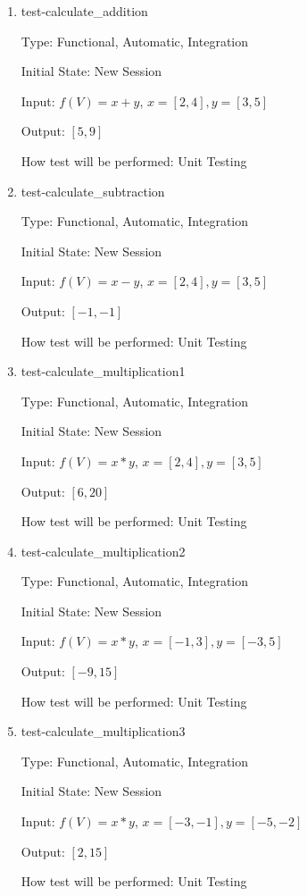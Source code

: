 \documentclass[12pt, titlepage]{article}
\begin{document}
\begin{enumerate}
	
	\item{test-calculate\_addition}
	
	Type: Functional, Automatic, Integration
	
	Initial State: New Session
	
	Input: $f(V) = x + y$, $x = [2,4], y = [3,5]$
	
	Output: $[5,9]$
	
	How test will be performed: Unit Testing\\
	
	\item{test-calculate\_subtraction}
	
	Type: Functional, Automatic, Integration
	
	Initial State: New Session
	
	Input: $f(V) = x - y$, $x = [2,4], y = [3,5]$
	
	Output: $[-1,-1]$
	
	How test will be performed: Unit Testing\\
	
	\item{test-calculate\_multiplication1}
	
	Type: Functional, Automatic, Integration
	
	Initial State: New Session
	
	Input: $f(V) = x * y$, $x = [2,4], y = [3,5]$
	
	Output: $[6,20]$
	
	How test will be performed: Unit Testing\\
	
	\item{test-calculate\_multiplication2}
	
	Type: Functional, Automatic, Integration
	
	Initial State: New Session
	
	Input: $f(V) = x * y$, $x = [-1,3], y = [-3,5]$
	
	Output: $[-9,15]$
	
	How test will be performed: Unit Testing\\
	
	\item{test-calculate\_multiplication3}
	
	Type: Functional, Automatic, Integration
	
	Initial State: New Session
	
	Input: $f(V) = x * y$, $x = [-3,-1], y = [-5,-2]$
	
	Output: $[2,15]$
	
	How test will be performed: Unit Testing\\
	
\end{enumerate}
\end{document}
